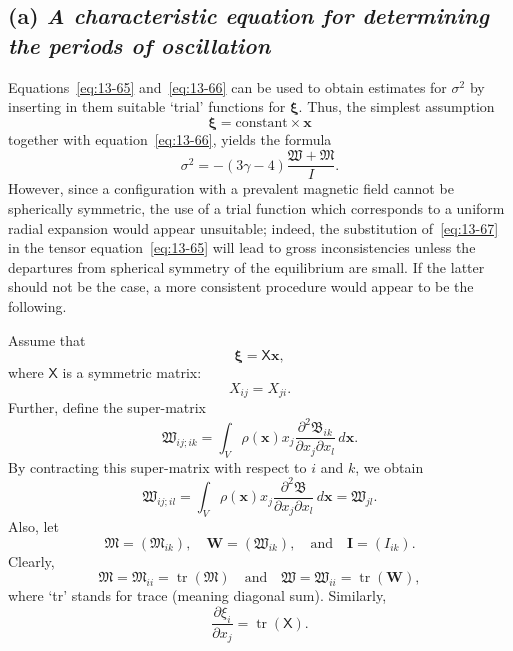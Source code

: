\subsection*{(a) \textit{A characteristic equation for determining the periods of oscillation}}

Equations~\eqref{eq:13-65} and~\eqref{eq:13-66} can be used to obtain estimates for $\sigma^2$ by inserting in them suitable `trial' functions for $\boldsymbol{\xi}$. Thus, the simplest assumption
\begin{equation}
\label{eq:13-67}
\boldsymbol{\xi} = \text{constant} \times \mathbf{x}
\end{equation}
together with equation~\eqref{eq:13-66}, yields the formula
\begin{equation}
\label{eq:13-68}
\sigma^2 = -(3\gamma-4)\frac{\mathfrak{W}+\mathfrak{M}}{I}.
\end{equation}
However, since a configuration with a prevalent magnetic field cannot be spherically symmetric, the use of a trial function which corresponds to a uniform radial expansion would appear unsuitable; indeed, the substitution of~\eqref{eq:13-67} in the tensor equation~\eqref{eq:13-65} will lead to gross inconsistencies unless the departures from spherical symmetry of the equilibrium are small. If the latter should not be the case, a more consistent procedure would appear to be the following.

Assume that
\begin{equation}
\label{eq:13-69}
\boldsymbol{\xi} = \mathsf{X}\mathbf{x},
\end{equation}
where $\mathsf{X}$ is a symmetric matrix:
\begin{equation}
\label{eq:13-70}
X_{ij} = X_{ji}.
\end{equation}
Further, define the super-matrix
\begin{equation}
\label{eq:13-71}
\mathfrak{W}_{ij;ik} = \int_V \rho(\mathbf{x}) x_j \frac{\partial^2\mathfrak{B}_{ik}}{\partial x_j \partial x_l}\,d\mathbf{x}.
\end{equation}
By contracting this super-matrix with respect to $i$ and $k$, we obtain
\begin{equation}
\label{eq:13-72}
\mathfrak{W}_{ij;il} = \int_V \rho(\mathbf{x}) x_j \frac{\partial^2\mathfrak{B}}{\partial x_j \partial x_l}\,d\mathbf{x} = \mathfrak{W}_{jl}.
\end{equation}
Also, let
\begin{equation}
\label{eq:13-73}
\boldsymbol{\mathfrak{M}} = (\mathfrak{M}_{ik}), \quad \mathbf{W} = (\mathfrak{W}_{ik}), \quad \text{and} \quad \mathbf{I} = (I_{ik}).
\end{equation}
Clearly,
\begin{equation}
\label{eq:13-74}
\mathfrak{M} = \mathfrak{M}_{ii} = \operatorname{tr}(\boldsymbol{\mathfrak{M}}) \quad \text{and} \quad \mathfrak{W} = \mathfrak{W}_{ii} = \operatorname{tr}(\mathbf{W}),
\end{equation}
where `tr' stands for trace (meaning diagonal sum). Similarly,
\begin{equation}
\label{eq:13-75}
\frac{\partial\xi_i}{\partial x_j} = \operatorname{tr}(\mathsf{X}).
\end{equation}


